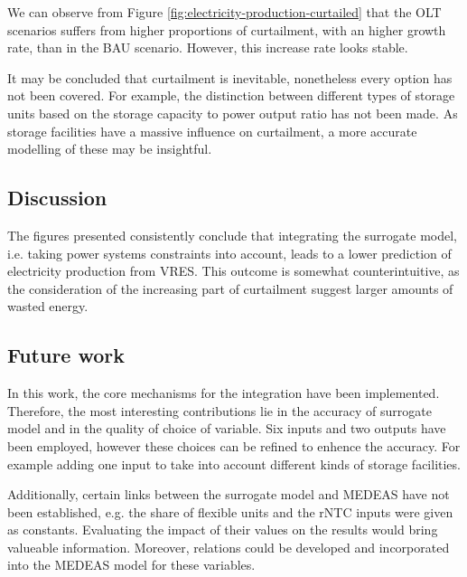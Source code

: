 We can observe from Figure \ref{fig:electricity-production-curtailed} that the OLT scenarios suffers from higher proportions of curtailment, with an higher growth rate, than in the BAU scenario. However, this increase rate looks stable.

It may be concluded that curtailment is inevitable, nonetheless every option has not been covered. For example, the distinction between different types of storage units based on the storage capacity to power output ratio has not been made. As storage facilities have a massive influence on curtailment, a more accurate modelling of these may be insightful.

\subsection{Discussion}

The figures presented consistently conclude that integrating the surrogate model, i.e. taking power systems constraints into account, leads to a lower prediction of electricity production from VRES. This outcome is somewhat counterintuitive, as the consideration of the increasing part of curtailment suggest larger amounts of wasted energy.

\subsection{Future work}

In this work, the core mechanisms for the integration have been implemented. Therefore, the most interesting contributions lie in the accuracy of surrogate model and in the quality of choice of variable. Six inputs and two outputs have been employed, however these choices can be refined to enhence the accuracy. For example adding one input to take into account different kinds of storage facilities.

Additionally, certain links between the surrogate model and MEDEAS have not been established, e.g. the share of flexible units and the rNTC inputs were given as constants. Evaluating the impact of their values on the results would bring valueable information. Moreover, relations could be developed and incorporated into the MEDEAS model for these variables.

